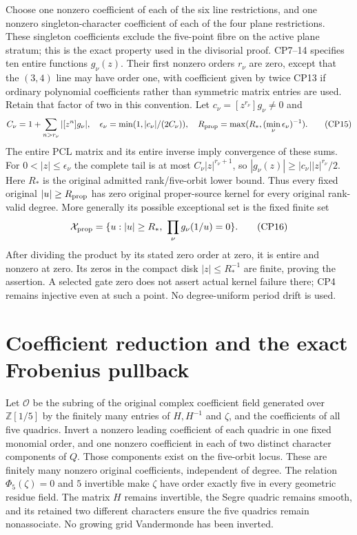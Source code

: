 \documentclass[11pt]{article}
\begin{document}
Choose one nonzero coefficient of each of the six line restrictions,
and one nonzero singleton-character coefficient of each of the four
plane restrictions. These singleton coefficients exclude the five-point
fibre on the active plane stratum; this is the exact property used in
the divisorial proof. CP7--14 specifies ten entire functions $g_\nu(z)$.
Their first nonzero orders $r_\nu$ are zero, except that the
$(3,4)$ line may have order one, with coefficient given by twice
CP13 if ordinary polynomial coefficients rather than symmetric
matrix entries are used. Retain that factor of two in this convention.
Let $c_\nu=[z^{r_\nu}]g_\nu\ne0$ and
\[
 C_\nu=1+\sum_{n>r_\nu}|[z^n]g_\nu|,\quad
 \epsilon_\nu=\min(1,|c_\nu|/(2C_\nu)),\quad
 R_{\rm prop}=\max(R_*,(\min_\nu\epsilon_\nu)^{-1}).              \tag{CP15}
\]
The entire PCL matrix and its entire inverse imply convergence of
these sums. For $0<|z|\le\epsilon_\nu$ the complete tail is at most
$C_\nu|z|^{r_\nu+1}$, so $|g_\nu(z)|\ge|c_\nu||z|^{r_\nu}/2$.
Here $R_*$ is the original admitted rank/five-orbit lower bound.
Thus every fixed original $|u|\ge R_{\rm prop}$ has zero original
proper-source kernel for every original rank-valid degree.
More generally its possible exceptional set is the fixed finite set
\[
 \mathcal X_{\rm prop}=\{u:|u|\ge R_*,\ \prod_\nu g_\nu(1/u)=0\}.
                                                                    \tag{CP16}
\]
After dividing the product by its stated zero order at zero, it is
entire and nonzero at zero. Its zeros in the compact disk
$|z|\le R_*^{-1}$ are finite, proving the assertion. A selected
gate zero does not assert actual kernel failure there; CP4 remains
injective even at such a point. No degree-uniform period drift is used.

\section{Coefficient reduction and the exact Frobenius pullback}
Let $\mathcal O$ be the subring of the original complex coefficient
field generated over $\mathbb Z[1/5]$ by the finitely many entries
of $H,H^{-1}$ and $\zeta$, and the coefficients of all five quadrics.
Invert a nonzero leading coefficient of each quadric in one fixed
monomial order, and one nonzero coefficient in each of two distinct
character components of $Q$. Those components exist on the five-orbit
locus. These are finitely many nonzero original coefficients, independent
of degree. The relation $\Phi_5(\zeta)=0$ and $5$ invertible make
$\zeta$ have order exactly five in every geometric residue field.
The matrix $H$ remains invertible, the Segre quadric remains smooth,
and its retained two different characters ensure the five quadrics
remain nonassociate. No growing grid Vandermonde has been inverted.
\end{document}
